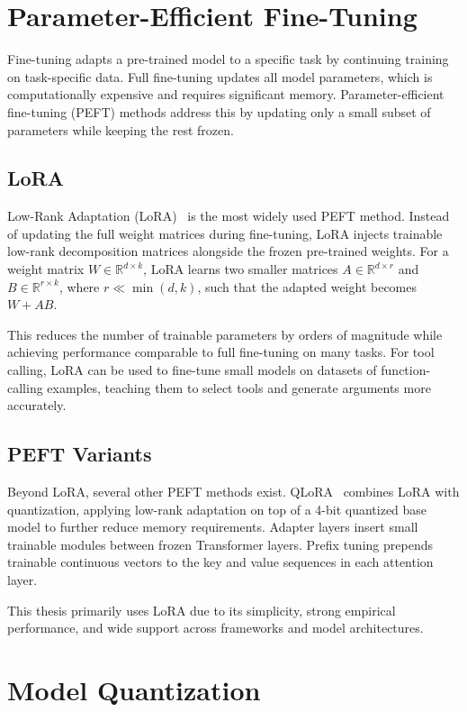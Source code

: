\section{Parameter-Efficient Fine-Tuning}

Fine-tuning adapts a pre-trained model to a specific task by continuing training on task-specific data. Full fine-tuning updates all model parameters, which is computationally expensive and requires significant memory. Parameter-efficient fine-tuning (PEFT) methods address this by updating only a small subset of parameters while keeping the rest frozen.

\subsection{LoRA}

Low-Rank Adaptation (LoRA)~\cite{hu2022lora} is the most widely used PEFT method. Instead of updating the full weight matrices during fine-tuning, LoRA injects trainable low-rank decomposition matrices alongside the frozen pre-trained weights. For a weight matrix $W \in \mathbb{R}^{d \times k}$, LoRA learns two smaller matrices $A \in \mathbb{R}^{d \times r}$ and $B \in \mathbb{R}^{r \times k}$, where $r \ll \min(d, k)$, such that the adapted weight becomes $W + AB$.

This reduces the number of trainable parameters by orders of magnitude while achieving performance comparable to full fine-tuning on many tasks. For tool calling, LoRA can be used to fine-tune small models on datasets of function-calling examples, teaching them to select tools and generate arguments more accurately.

\subsection{PEFT Variants}

Beyond LoRA, several other PEFT methods exist. QLoRA~\cite{dettmers2023qlora} combines LoRA with quantization, applying low-rank adaptation on top of a 4-bit quantized base model to further reduce memory requirements. Adapter layers insert small trainable modules between frozen Transformer layers. Prefix tuning prepends trainable continuous vectors to the key and value sequences in each attention layer.

This thesis primarily uses LoRA due to its simplicity, strong empirical
performance, and wide support across frameworks and model architectures.

\section{Model Quantization}

